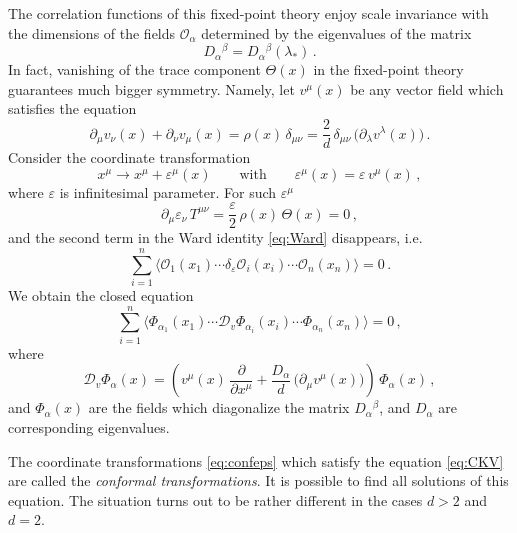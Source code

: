The correlation functions of this fixed-point theory enjoy scale invariance with
the dimensions of the fields $\mathcal O_\alpha$ determined by the eigenvalues of
the matrix
\[
D_\alpha{}^\beta=D_\alpha{}^\beta(\lambda_*)\,.
\]
In fact, vanishing of the trace component $\Theta(x)$ in the fixed-point theory
guarantees much bigger symmetry. Namely, let $v^\mu(x)$ be any vector field which
satisfies the equation
\begin{equation}\label{eq:CKV}
\partial_\mu v_\nu(x)+\partial_\nu v_\mu(x)=\rho(x)\,\delta_{\mu\nu}=\frac2d\,\delta_{\mu\nu}\,\bigl(\partial_\lambda v^\lambda(x)\bigr)\,.
\end{equation}
Consider the coordinate transformation
\begin{equation}\label{eq:confeps}
x^\mu\to x^\mu+\varepsilon^\mu(x)\qquad\text{with}\qquad\varepsilon^\mu(x)=\varepsilon\,v^\mu(x)\,,
\end{equation}
where $\varepsilon$ is infinitesimal parameter. For such $\varepsilon^\mu$
\[
\partial_\mu\varepsilon_\nu\,T^{\mu\nu}=\frac\varepsilon2\,\rho(x)\,\Theta(x)=0\,,
\]
and the second term in the Ward identity \eqref{eq:Ward} disappears, i.e.
\begin{equation}\label{eq:WardConf}
\sum_{i=1}^n\bigl\langle\mathcal O_1(x_1)\cdots\delta_\varepsilon\mathcal O_i(x_i)\cdots\mathcal O_n(x_n)\bigr\rangle=0\,.
\end{equation}
We obtain the closed equation
\begin{equation}\label{eq:WardConf2}
\sum_{i=1}^n\bigl\langle\Phi_{\alpha_1}(x_1)\cdots\mathcal D_v\Phi_{\alpha_i}(x_i)\cdots\Phi_{\alpha_n}(x_n)\bigr\rangle=0\,,
\end{equation}
where
\[
\mathcal D_v\Phi_\alpha(x)=\left(v^\mu(x)\,\frac\partial{\partial x^\mu}+\frac{D_\alpha}d\,\bigl(\partial_\mu v^\mu(x)\bigr)\right)\,\Phi_\alpha(x)\,,
\]
and $\Phi_\alpha(x)$ are the fields which diagonalize the matrix $D_\alpha{}^\beta$,
and $D_\alpha$ are corresponding eigenvalues.

The coordinate transformations \eqref{eq:confeps} which satisfy the equation
\eqref{eq:CKV} are called the \emph{conformal transformations}. It is possible to
find all solutions of this equation. The situation turns out to be rather different
in the cases $d>2$ and $d=2$.

